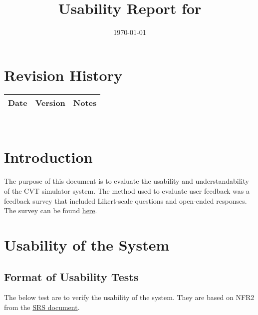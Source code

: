 \documentclass[12pt, titlepage]{article}
\begin{document}
\title{Usability Report for \progname{}} 
\author{\authname}
\date{\today}
	
\maketitle


\section*{Revision History}

\begin{tabularx}{\textwidth}{p{3cm}p{2cm}X}
\toprule {\bf Date} & {\bf Version} & {\bf Notes}\\
\midrule

\bottomrule
\end{tabularx}

~\\

\newpage

\tableofcontents



\newpage


\newpage


\section{Introduction}

The purpose of this document is to evaluate the usability and understandability of the CVT simulator system. The method used to evaluate user feedback was a feedback survey that included Likert-scale questions and open-ended responses.
The survey can be found \href{https://forms.office.com/r/RkeDW31ZTS}{here}. 

\section{Usability of the System}

\subsection{Format of Usability Tests}

The below test are to verify the usability of the system.
They are based on NFR2 from the \href{https://github.com/gr812b/CVT-Simulator/blob/main/docs/SRS/SRS.pdf}{SRS document}.
\end{document}
